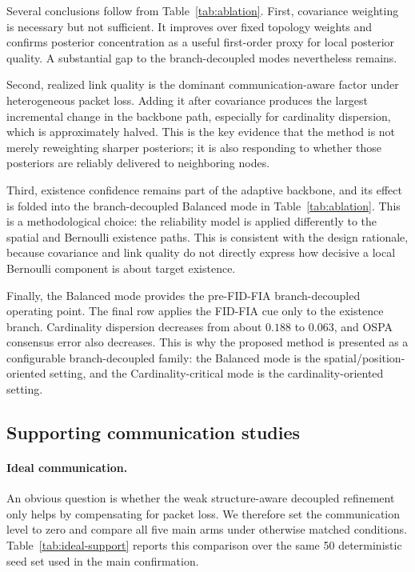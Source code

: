 Several conclusions follow from Table~\ref{tab:ablation}. First, covariance weighting is necessary but not sufficient. It improves over fixed topology weights and confirms posterior concentration as a useful first-order proxy for local posterior quality. A substantial gap to the branch-decoupled modes nevertheless remains.

Second, realized link quality is the dominant communication-aware factor under heterogeneous packet loss. Adding it after covariance produces the largest incremental change in the backbone path, especially for cardinality dispersion, which is approximately halved. This is the key evidence that the method is not merely reweighting sharper posteriors; it is also responding to whether those posteriors are reliably delivered to neighboring nodes.

Third, existence confidence remains part of the adaptive backbone, and its effect is folded into the branch-decoupled Balanced mode in Table~\ref{tab:ablation}. This is a methodological choice: the reliability model is applied differently to the spatial and Bernoulli existence paths. This is consistent with the design rationale, because covariance and link quality do not directly express how decisive a local Bernoulli component is about target existence.

Finally, the Balanced mode provides the pre-FID-FIA branch-decoupled operating point. The final row applies the FID-FIA cue only to the existence branch. Cardinality dispersion decreases from about $0.188$ to $0.063$, and OSPA consensus error also decreases. This is why the proposed method is presented as a configurable branch-decoupled family: the Balanced mode is the spatial/position-oriented setting, and the Cardinality-critical mode is the cardinality-oriented setting.

\FloatBarrier

\subsection{Supporting communication studies}

\paragraph{Ideal communication.}
An obvious question is whether the weak structure-aware decoupled refinement only helps by compensating for packet loss. We therefore set the communication level to zero and compare all five main arms under otherwise matched conditions. Table~\ref{tab:ideal-support} reports this comparison over the same 50 deterministic seed set used in the main confirmation.


